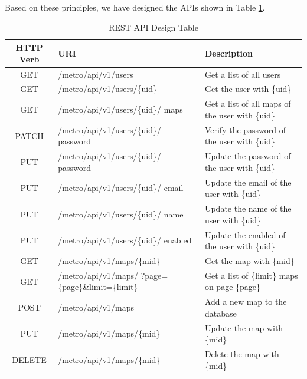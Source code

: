 Based on these principles, we have designed the APIs shown in Table \ref{tab:REST API Design Table}.
\begin{table}[!htb]
  \centering
  \begin{tabularx}{\textwidth}{>{\raggedright}cXX}
    \toprule[1.5pt]
    \textbf{HTTP Verb} & \textbf{URI} & \textbf{Description}
    \\ \midrule[1.5pt]
    GET & /metro/api/v1/users & Get a list of all users
    \\ \midrule
    GET & /metro/api/v1/users/\{uid\} & Get the user with \{uid\}
    \\ \midrule
    GET & /metro/api/v1/users/\{uid\}/ maps & Get a list of all maps of the user with \{uid\}
    \\ \midrule
    PATCH & /metro/api/v1/users/\{uid\}/ password & Verify the password of the user with \{uid\}
    \\ \midrule
    PUT & /metro/api/v1/users/\{uid\}/ password & Update the password of the user with \{uid\}
    \\ \midrule
    PUT & /metro/api/v1/users/\{uid\}/ email & Update the email of the user with \{uid\} \\ \midrule
    PUT & /metro/api/v1/users/\{uid\}/ name & Update the name of the user with \{uid\} \\ \midrule
    PUT & /metro/api/v1/users/\{uid\}/ enabled & Update the enabled of the user with \{uid\}
    \\ \midrule
    GET & /metro/api/v1/maps/\{mid\} & Get the map with \{mid\}
    \\ \midrule
    GET & /metro/api/v1/maps/ ?page=\{page\}\&limit=\{limit\} & Get a list of \{limit\} maps on page \{page\}
    \\ \midrule
    POST & /metro/api/v1/maps & Add a new map to the database
    \\ \midrule
    PUT & /metro/api/v1/maps/\{mid\} & Update the map with \{mid\}
    \\ \midrule
    DELETE & /metro/api/v1/maps/\{mid\} & Delete the map with \{mid\}
    \\ \bottomrule[1.5pt]
  \end{tabularx}
  \caption[REST API Design Table]{REST API Design Table}
  \label{tab:REST API Design Table}
\end{table}

